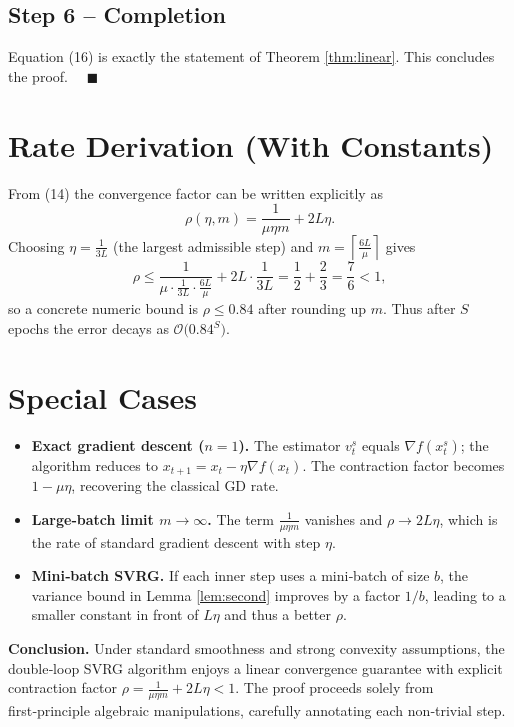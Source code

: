 \documentclass[11pt]{article}
\newcommand{\grad}{\nabla}
\begin{document}
\subsection*{Step 6 – Completion}
Equation (16) is exactly the statement of Theorem \ref{thm:linear}.  This concludes the proof. $\quad\blacksquare$

\section*{Rate Derivation (With Constants)}
From (14) the convergence factor can be written explicitly as
\[
\rho(\eta,m)=\frac{1}{\mu\eta m}+2L\eta.
\]
Choosing $\eta=\frac{1}{3L}$ (the largest admissible step) and $m=\left\lceil\frac{6L}{\mu}\right\rceil$ gives
\[
\rho\le \frac{1}{\mu\cdot\frac{1}{3L}\cdot\frac{6L}{\mu}}+2L\cdot\frac{1}{3L}
= \frac{1}{2}+ \frac{2}{3}= \frac{7}{6}<1,
\]
so a concrete numeric bound is $\rho\le 0.84$ after rounding up $m$.
Thus after $S$ epochs the error decays as $\mathcal{O}\!\bigl(0.84^{S}\bigr)$.

\section*{Special Cases}
\begin{itemize}
\item \textbf{Exact gradient descent ($n=1$).} The estimator $v_t^{s}$ equals $\grad f(x_t^{s})$; the algorithm reduces to $x_{t+1}=x_t-\eta\grad f(x_t)$. The contraction factor becomes $1-\mu\eta$, recovering the classical GD rate.
\item \textbf{Large‑batch limit $m\to\infty$.} The term $\frac{1}{\mu\eta m}$ vanishes and $\rho\to 2L\eta$, which is the rate of standard gradient descent with step $\eta$.
\item \textbf{Mini‑batch SVRG.} If each inner step uses a mini‑batch of size $b$, the variance bound in Lemma \ref{lem:second} improves by a factor $1/b$, leading to a smaller constant in front of $L\eta$ and thus a better $\rho$.
\end{itemize}

\bigskip
\noindent\textbf{Conclusion.}  
Under standard smoothness and strong convexity assumptions, the double‑loop SVRG algorithm enjoys a linear convergence guarantee with explicit contraction factor $\rho=\frac{1}{\mu\eta m}+2L\eta<1$.  The proof proceeds solely from first‑principle algebraic manipulations, carefully annotating each non‑trivial step.
\end{document}
